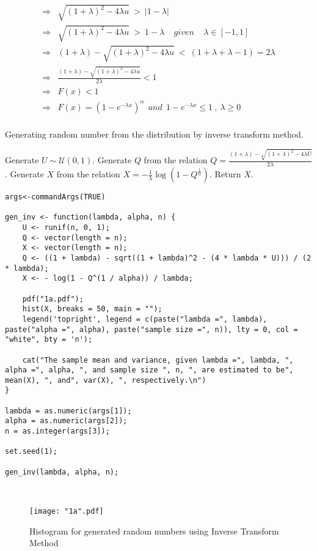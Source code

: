 \documentclass[11pt]{article}
\begin{document}
\begin{enumerate}
\begin{itemize}
\begin{equation}
\begin{split}
\Rightarrow & \sqrt{(1 + \lambda)^{2} - 4 \lambda u} ~>~ |1-\lambda|  \\
\Rightarrow & \sqrt{(1 + \lambda)^{2} - 4 \lambda u} ~>~ 1-\lambda   ~~~~~given~~~~~ \lambda \in [-1,1]\\
\Rightarrow & (1 + \lambda) - \sqrt{(1 + \lambda)^{2} - 4 \lambda u} ~<~ (1+\lambda + \lambda -1)=2\lambda  \\
\Rightarrow & \frac{(1 + \lambda) - \sqrt{(1 + \lambda)^{2} - 4 \lambda u}}{2 \lambda} < 1\\
\Rightarrow & F(x) < 1\\
\Rightarrow & F(x)=  (1-e^{- \lambda x})^{\alpha} ~~and~~ 1-e^{- \lambda x} \leq 1 ~,~ \lambda \geq 0 \\
\end{split}\nonumber
\end{equation}
\begin{algorithm}[H]
\caption{Generating random number from the distribution by inverse transform method.}
\begin{algorithmic}[1]
\STATE Generate $U \sim \mathcal{U}(0,1)$.
\STATE Generate $Q$ from the relation $Q = \frac{(1 + \lambda) - \sqrt{(1 + \lambda)^{2} - 4 \lambda U}}{2 \lambda}$.
\STATE Generate $X$ from the relation $X = - \frac{1}{\lambda} \log(1 - Q^{\frac{1}{\alpha}})$.
\STATE Return $X$.
\end{algorithmic}
\end{algorithm}
{}
\begin{lstlisting}
args<-commandArgs(TRUE)

gen_inv <- function(lambda, alpha, n) {
	U <- runif(n, 0, 1);
	Q <- vector(length = n);
	X <- vector(length = n);
	Q <- ((1 + lambda) - sqrt((1 + lambda)^2 - (4 * lambda * U))) / (2 * lambda);
	X <- - log(1 - Q^(1 / alpha)) / lambda;

	pdf("1a.pdf");
	hist(X, breaks = 50, main = "");
	legend('topright', legend = c(paste("lambda =", lambda), paste("alpha =", alpha), paste("sample size =", n)), lty = 0, col = "white", bty = 'n');

	cat("The sample mean and variance, given lambda =", lambda, ", alpha =", alpha, ", and sample size ", n, ", are estimated to be", mean(X), ", and", var(X), ", respectively.\n")
}

lambda = as.numeric(args[1]);
alpha = as.numeric(args[2]);
n = as.integer(args[3]);

set.seed(1);

gen_inv(lambda, alpha, n);
\end{lstlisting}
\newpage
{}\\
\begin{figure}[H]
	\centering
	\texttt{[image: "1a".pdf]}
		\caption{Histogram for generated random numbers using Inverse Transform Method}
\end{figure}


\end{itemize}
\end{enumerate}
\end{document}
